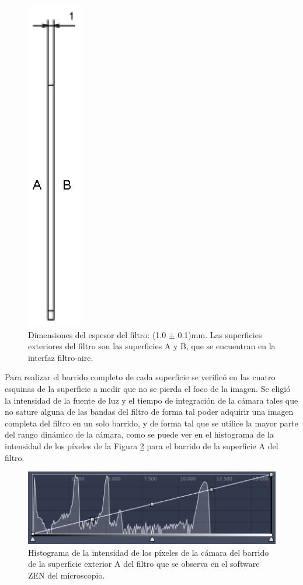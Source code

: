 \begin{figure}[H]
	\centering
	\includegraphics[scale=0.4]{Figs/cuantificaciondefectos/espesorfiltro.png}
	\caption{Dimensiones del espesor del filtro: (1.0 $\pm$ 0.1)mm. Las superficies exteriores del filtro son las superficies A y B, que se encuentran en la interfaz filtro-aire.}
	\label{fig:espfil}
\end{figure}
Para realizar el barrido completo de cada superficie se verificó en las cuatro esquinas de la superficie a medir que no se pierda el foco de la imagen. Se eligió la intensidad de la fuente de luz y el tiempo de integración de la cámara tales que no sature alguna de las bandas del filtro de forma tal poder adquirir una imagen completa del filtro en un solo barrido, y de forma tal que se utilice la mayor parte del rango dinámico de la cámara, como se puede ver en el histograma de la intensidad de los píxeles de la Figura \ref{fig:histograma15x15} para el barrido de la superficie A del filtro. 
\begin{figure}[H]
	\centering
	\includegraphics[width=1.0\textwidth]{Figs/defectosZEISS/histograma15x15.png}
	\caption{Histograma de la intensidad de los píxeles de la cámara del barrido de la superficie exterior A del filtro que se observa en el software ZEN del microscopio.}
	\label{fig:histograma15x15}
\end{figure}
